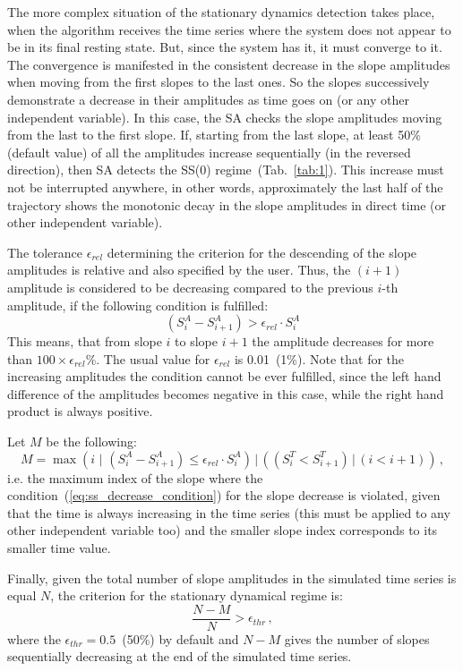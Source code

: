 \documentclass[11pt,a4paper]{article}
\begin{document}
The more complex situation of the stationary dynamics detection takes place, when the
algorithm receives the time series where the system does not appear to be in its
final resting state. But, since the system has it, it must converge to it. The
convergence is manifested in the consistent decrease in the slope amplitudes when
moving from the first slopes to the last ones. So the slopes successively demonstrate
a decrease in their amplitudes as time goes on (or any other independent
variable). In this case, the SA checks the slope amplitudes moving from the last to
the first slope. If, starting from the last slope, at least 50\% (default value) of
all the amplitudes increase sequentially (in the reversed direction), then SA detects
the SS(0) regime~(Tab.~\ref{tab:1}). This increase must not be interrupted anywhere,
in other words, approximately the last half of the trajectory shows the monotonic
decay in the slope amplitudes in direct time (or other independent variable).

The tolerance $\epsilon_{rel}$ determining the criterion for the descending of the
slope amplitudes is relative and also specified by the user. Thus, the $(i+1)$
amplitude is considered to be decreasing compared to the previous $i$-th
amplitude, if the following condition is fulfilled:
\begin{equation}
  \label{eq:ss_decrease_condition}
  (S^A_{i}-S^A_{i+1}) > \epsilon_{rel}\cdot S^A_{i}
\end{equation}
This means, that from slope $i$ to slope $i+1$ the amplitude decreases for more than
$100\times\epsilon_{rel}\%$. The usual value for $\epsilon_{rel}$ is 0.01~(1\%). Note
that for the increasing amplitudes the condition cannot be ever fulfilled, since the
left hand difference of the amplitudes becomes negative in this case, while the right
hand product is always positive.

Let $M$ be the following:
\begin{equation}
  \label{eq:ss_decrease}
  M = \max\left(i\,\, |\,\, (S^A_{i}-S^A_{i+1}) \le \epsilon_{rel}\cdot S^A_{i}\right)\,|\, \left( (S^T_i < S^T_{i+1}) \,|\, (i < i+1)\right)\,,
\end{equation}
i.e. the maximum index of the slope where the
condition~(\ref{eq:ss_decrease_condition}) for the slope decrease is violated, given
that the time is always increasing in the time series (this must be applied to any
other independent variable too) and the smaller slope index corresponds to its
smaller time value.

Finally, given the total number of slope amplitudes in the simulated time series is
equal $N$, the criterion for the stationary dynamical regime is:
\begin{equation}
  \label{eq:ss_detection_condition}
  \frac{N-M}{N} > \epsilon_{thr}\,,
\end{equation}
where the $\epsilon_{thr}=0.5$~(50\%) by default and $N-M$ gives the number of slopes
sequentially decreasing at the end of the simulated time series.
\end{document}
